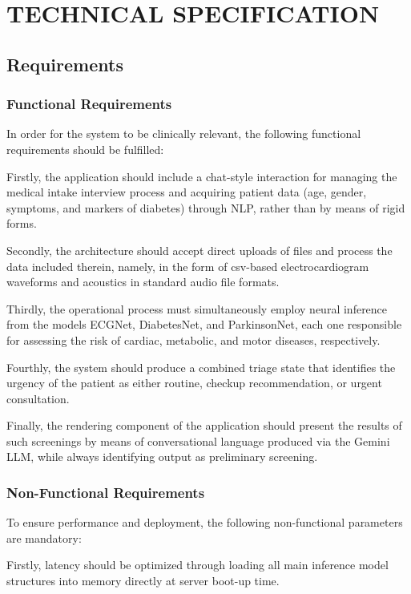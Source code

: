\chapter{\MakeUppercase{Technical Specification}}
\justifying

\section{Requirements}

\subsection{Functional Requirements}

In order for the system to be clinically relevant, the following functional requirements should be fulfilled:

Firstly, the application should include a chat-style interaction for managing the medical intake interview process and acquiring patient data (age, gender, symptoms, and markers of diabetes) through NLP, rather than by means of rigid forms.

Secondly, the architecture should accept direct uploads of files and process the data included therein, namely, in the form of \ac{csv}-based electrocardiogram waveforms and acoustics in standard audio file formats.

Thirdly, the operational process must simultaneously employ neural inference from the models ECGNet, DiabetesNet, and ParkinsonNet, each one responsible for assessing the risk of cardiac, metabolic, and motor diseases, respectively.

Fourthly, the system should produce a combined triage state that identifies the urgency of the patient as either routine, checkup recommendation, or urgent consultation.

Finally, the rendering component of the application should present the results of such screenings by means of conversational language produced via the Gemini LLM, while always identifying output as preliminary screening.

\subsection{Non-Functional Requirements}

To ensure performance and deployment, the following non-functional parameters are mandatory:

Firstly, latency should be optimized through loading all main inference model structures into memory directly at server boot-up time.

